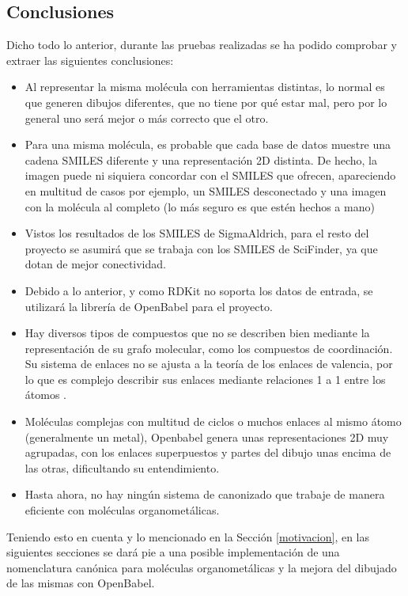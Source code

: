 \subsection{Conclusiones}
Dicho todo lo anterior, durante las pruebas realizadas se ha podido comprobar y extraer las siguientes conclusiones:

\begin{itemize}
    \item Al representar la misma molécula con herramientas distintas, lo normal es que generen dibujos diferentes, que no tiene por qué estar mal, pero por lo general uno será mejor o más correcto que el otro.
    \item Para una misma molécula, es probable que cada base de datos muestre una cadena SMILES diferente y una representación 2D distinta. De hecho, la imagen puede ni siquiera concordar con el SMILES que ofrecen, apareciendo en multitud de casos por ejemplo, un SMILES desconectado y una imagen con la molécula al completo (lo más seguro es que estén hechos a mano)
    \item Vistos los resultados de los SMILES de SigmaAldrich, para el resto del proyecto se asumirá que se trabaja con los SMILES de SciFinder, ya que dotan de mejor conectividad. 
    \item Debido a lo anterior, y como RDKit no soporta los datos de entrada, se utilizará la librería de OpenBabel para el proyecto.
    \item Hay diversos tipos de compuestos que no se describen bien mediante la representación de su grafo molecular, como los compuestos de coordinación. Su sistema de enlaces no se ajusta a la teoría de los enlaces de valencia, por lo que es complejo describir sus enlaces mediante relaciones 1 a 1 entre los átomos \cite{david_molecular_2020}.
    \item Moléculas complejas con multitud de ciclos o muchos enlaces al mismo átomo (generalmente un metal), Openbabel genera unas representaciones 2D muy agrupadas, con los enlaces superpuestos y partes del dibujo unas encima de las otras, dificultando su entendimiento.
    \item Hasta ahora, no hay ningún sistema de canonizado que trabaje de manera eficiente con moléculas organometálicas.
    
\end{itemize}


Teniendo esto en cuenta y lo mencionado en la Sección \ref{motivacion}, en las siguientes secciones se dará pie a una posible implementación de una nomenclatura canónica para moléculas organometálicas y la mejora del dibujado de las mismas con OpenBabel.





